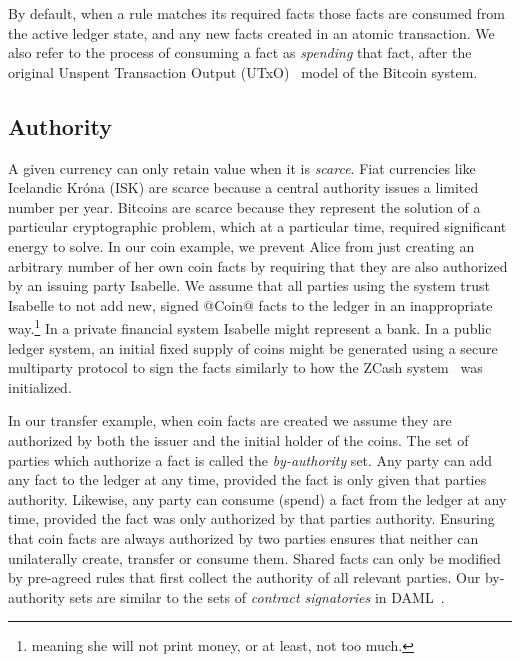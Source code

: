 By default, when a rule matches its required facts those facts are consumed from the active ledger state, and any new facts created in an atomic transaction. We also refer to the process of consuming a fact as \emph{spending} that fact, after the original Unspent Transaction Output (UTxO)~\cite{Zahnentferner2018:UTxO} model of the Bitcoin system.



\subsection{Authority}
\label{s:FactAuthority}
A given currency can only retain value when it is \emph{scarce}. Fiat currencies like Icelandic Kr\'ona (ISK) are scarce because a central authority issues a limited number per year. Bitcoins are scarce because they represent the solution of a particular cryptographic problem, which at a particular time, required significant energy to solve. In our coin example, we prevent Alice from just creating an arbitrary number of her own coin facts by requiring that they are also authorized by an issuing party Isabelle. We assume that all parties using the system trust Isabelle to not add new, signed @Coin@ facts to the ledger in an inappropriate way.\footnote{meaning she will not print money, or at least, not too much.} In a private financial system Isabelle might represent a bank. In a public ledger system, an initial fixed supply of coins might be generated using a secure multiparty protocol to sign the facts similarly to how the ZCash system~\cite{Bowe2018:MultiParty, Hopwood2016:zcash} was initialized.

In our transfer example, when coin facts are created we assume they are authorized by both the issuer and the initial holder of the coins. The set of parties which authorize a fact is called the \emph{by-authority} set. Any party can add any fact to the ledger at any time, provided the fact is only given that parties authority. Likewise, any party can consume (spend) a fact from the ledger at any time, provided the fact was only authorized by that parties authority. Ensuring that coin facts are always authorized by two parties ensures that neither can unilaterally create, transfer or consume them. Shared facts can only be modified by pre-agreed rules that first collect the authority of all relevant parties. Our by-authority sets are similar to the sets of \emph{contract signatories} in DAML~\cite{DA2019:DAML}.


